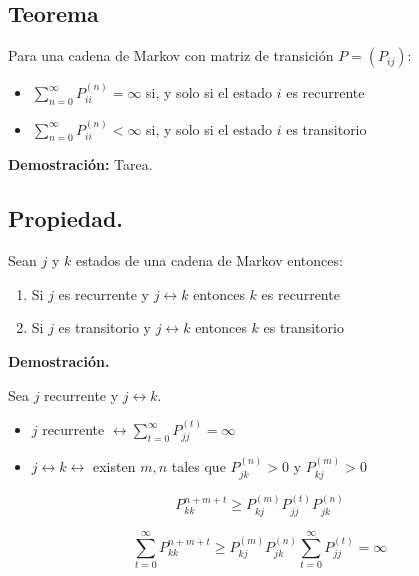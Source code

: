 \documentclass[12pt,a4paper]{article}
\begin{document}
\subsection*{Teorema}

Para una cadena de Markov con matriz de transición $P = (P_{ij})$:

\begin{itemize}
    \item $\sum_{n=0}^{\infty} P_{ii}^{(n)} = \infty$ si, y solo si el estado $i$ es recurrente
    \item $\sum_{n=0}^{\infty} P_{ii}^{(n)} < \infty$ si, y solo si el estado $i$ es transitorio
\end{itemize}

\textbf{Demostración:} Tarea.

\subsection*{Propiedad.}

Sean $j$ y $k$ estados de una cadena de Markov entonces:

\begin{enumerate}
    \item Si $j$ es recurrente y $j \leftrightarrow k$ entonces $k$ es recurrente
    \item Si $j$ es transitorio y $j \leftrightarrow k$ entonces $k$ es transitorio
\end{enumerate}

\textbf{Demostración.}

Sea $j$ recurrente y $j \leftrightarrow k$.

\begin{itemize}
    \item $j$ recurrente $\leftrightarrow \sum_{t=0}^{\infty} P_{jj}^{(t)} = \infty$
    \item $j \leftrightarrow k \leftrightarrow$ existen $m, n$ tales que $P_{jk}^{(n)} > 0$ y $P_{kj}^{(m)} > 0$
\end{itemize}

\begin{equation*}
P_{kk}^{n+m+t} \geq P_{kj}^{(m)} P_{jj}^{(t)} P_{jk}^{(n)}
\end{equation*}

\begin{equation*}
\sum_{t=0}^{\infty} P_{kk}^{n+m+t} \geq P_{kj}^{(m)} P_{jk}^{(n)} \sum_{t=0}^{\infty} P_{jj}^{(t)} = \infty
\end{equation*}
\end{document}

